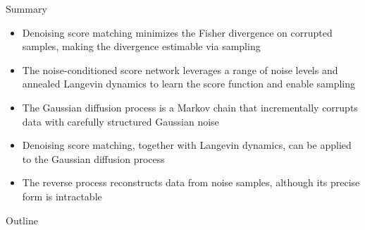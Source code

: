 \documentclass{beamer}
\begin{document}
\begin{frame}{Summary}
	\begin{itemize}
		\item Denoising score matching minimizes the Fisher divergence on corrupted samples, making the divergence estimable via sampling
		\vfill 
		\item The noise-conditioned score network leverages a range of noise levels and annealed Langevin dynamics to learn the score function and enable sampling	
		\vfill
		\item The Gaussian diffusion process is a Markov chain that incrementally corrupts data with carefully structured Gaussian noise
		\vfill
		\item Denoising score matching, together with Langevin dynamics, can be applied to the Gaussian diffusion process
		\vfill
		\item The reverse process reconstructs data from noise samples, although its precise form is intractable
	\end{itemize}
\end{frame}


\begin{frame}
\titlepage
\end{frame}







\begin{frame}{Outline}
    \tableofcontents
\end{frame}
\end{document}
